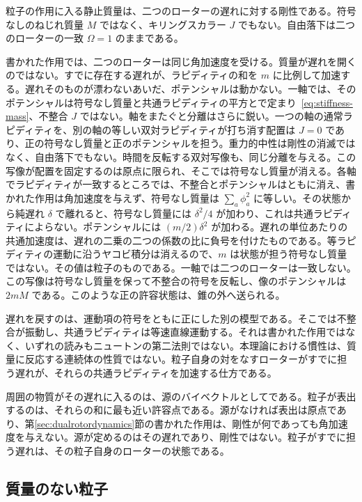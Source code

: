 \documentclass[a4paper]{article}
\begin{document}
粒子の作用に入る静止質量は、二つのローターの遅れに対する剛性である。符号なしのねじれ質量 $M$ ではなく、キリングスカラー $J$ でもない。自由落下は二つのローターの一致 $\Omega=1$ のままである。

書かれた作用では、二つのローターは同じ角加速度を受ける。質量が遅れを開くのではない。すでに存在する遅れが、ラピディティの和を $m$ に比例して加速する。遅れそのものが漂わないあいだ、ポテンシャルは動かない。一軸では、そのポテンシャルは符号なし質量と共通ラピディティの平方とで定まり~\eqref{eq:stiffness-mass}、不整合 $J$ ではない。軸をまたぐと分離はさらに鋭い。一つの軸の通常ラピディティを、別の軸の等しい双対ラピディティが打ち消す配置は $J=0$ であり、正の符号なし質量と正のポテンシャルを担う。重力的中性は剛性の消滅ではなく、自由落下でもない。時間を反転する双対写像も、同じ分離を与える。この写像が配置を固定するのは原点に限られ、そこでは符号なし質量が消える。各軸でラピディティが一致するところでは、不整合とポテンシャルはともに消え、書かれた作用は角加速度を与えず、符号なし質量は \(\sum_a\phi_a^2\) に等しい。その状態から純遅れ \(\delta\) で離れると、符号なし質量には \(\delta^2/4\) が加わり、これは共通ラピディティによらない。ポテンシャルには \((m/2)\delta^2\) が加わる。遅れの単位あたりの共通加速度は、遅れの二乗の二つの係数の比に負号を付けたものである。等ラピディティの運動に沿うヤコビ積分は消えるので、\(m\) は状態が担う符号なし質量ではない。その値は粒子のものである。一軸では二つのローターは一致しない。この写像は符号なし質量を保って不整合の符号を反転し、像のポテンシャルは \(2mM\) である。このような正の許容状態は、錐の外へ送られる。

遅れを戻すのは、運動項の符号をともに正にした別の模型である。そこでは不整合が振動し、共通ラピディティは等速直線運動する。それは書かれた作用ではなく、いずれの読みもニュートンの第二法則ではない。本理論における慣性は、質量に反応する連続体の性質ではない。粒子自身の対をなすローターがすでに担う遅れが、それらの共通ラピディティを加速する仕方である。

周囲の物質がその遅れに入るのは、源のバイベクトルとしてである。粒子が表出するのは、それらの和に最も近い許容点である。源がなければ表出は原点であり、第\ref{sec:dualrotordynamics}節の書かれた作用は、剛性が何であっても角加速度を与えない。源が定めるのはその遅れであり、剛性ではない。粒子がすでに担う遅れは、その粒子自身のローターの状態である。

\subsection{質量のない粒子}
\end{document}

